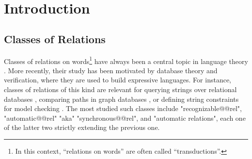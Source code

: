 \section{Introduction}
\AP\label{sec:dichotomy-introduction}


\subsection{Classes of Relations}

Classes of relations on words\footnote{In this context, ``relations on words''
are often called ``transductions''.} have always been a central topic in language theory
\cite{ElgotMezi1965RelationsGeneralizedAutomata,Nivat1968TransductionChomsky,Berstel1979Transductions,FrougnySakarovitch1993SynchronizedRationalRelations,Choffrut2006Survey}. 
More recently, their study has been motivated by database theory and verification,
where they are used to build expressive languages. For instance, classes of relations of this kind are relevant for querying strings over relational 
databases \cite{BenediktLibkinSchwentickSegoufin2003DefinableRelations}, comparing paths in graph databases \cite{BarceloLibkinLinWood2012ExpressiveLanguages}, or defining  
string constraints for model checking \cite{LinBarcelo2016StringSolvingWordEquationsTransducers}. 
The most studied such classes include "recognizable@@rel", "automatic@@rel" "aka" "synchronous@@rel", and "automatic relations", each one of the latter two strictly extending the previous one. 


